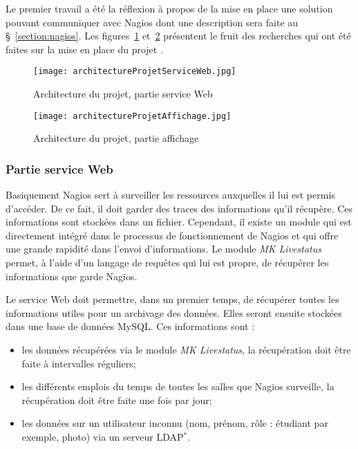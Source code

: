 Le premier travail a \'et\'e la r\'eflexion \`a propos de la mise en place une solution pouvant communiquer avec Nagios dont une description sera faite au \S~\ref{section:nagios}.
Les figures~\ref{figure:architectureProjetServiceWeb} et~\ref{figure:architectureProjetAffichage} pr\'esentent le fruit des recherches qui ont \'et\'e faites sur la mise en place du projet \YuukouII.

\begin{figure}[!ht]
	\centering
	\texttt{[image: architectureProjetServiceWeb.jpg]}
	\caption{Architecture du projet, partie service Web}
	\label{figure:architectureProjetServiceWeb}

\end{figure}

\begin{figure}[!ht]
	\centering
	\texttt{[image: architectureProjetAffichage.jpg]}
	\caption{Architecture du projet, partie affichage}
	\label{figure:architectureProjetAffichage}

\end{figure}

\subsubsection{Partie service Web}

Basiquement Nagios sert \`a surveiller les ressources auxquelles il lui est permis d'acc\'eder.
De ce fait, il doit garder des traces des informations qu'il r\'ecup\`ere.
Ces informations sont stock\'ees dans un fichier.
Cependant, il existe un module qui est directement int\'egr\'e dans le processus de fonctionnement de Nagios et qui offre une grande rapidit\'e dans l'envoi d'informations.
Le module \textit{MK Livestatus} permet, \`a l'aide d'un langage de requ\^etes qui lui est propre, de r\'ecup\'erer les informations que garde Nagios.

Le service Web doit permettre, dans un premier temps, de r\'ecup\'erer toutes les informations utiles pour un archivage des donn\'ees.
Elles seront ensuite stock\'ees dans une base de donn\'ees MySQL.
\noindent Ces informations sont :

\begin{itemize}
	\item les donn\'ees r\'ecup\'er\'ees via le module \textit{MK Livestatus}, la r\'ecup\'eration doit \^etre faite \`a intervalles r\'eguliers;
	\item les diff\'erents emplois du temps de toutes les salles que Nagios surveille, la r\'ecup\'eration doit \^etre faite une fois par jour;
	\item les donn\'ees sur un utilisateur inconnu (nom, pr\'enom, r\^ole : \'etudiant par exemple, photo) via un serveur LDAP$^*$.

\end{itemize}

